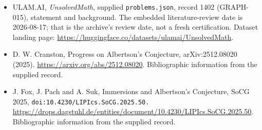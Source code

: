 \documentclass[11pt,a4paper]{article}
\begin{document}
{\small

\begin{itemize}

\item[\hypertarget{source:1402:1}{S1}] ULAM.AI, \emph{UnsolvedMath}, supplied \texttt{problems.json}, record 1402 (GRAPH-015), statement and background. The embedded literature-review date is 2026-08-17; that is the archive’s review date, not a fresh certification. Dataset landing page: \url{https://huggingface.co/datasets/ulamai/UnsolvedMath}.

\item[\hypertarget{source:1402:2}{S2}] D. W. Cranston, Progress on Albertson's Conjecture, arXiv:2512.08020 (2025). \url{https://arxiv.org/abs/2512.08020}. Bibliographic information from the supplied record.

\item[\hypertarget{source:1402:3}{S3}] J. Fox, J. Pach and A. Suk, Immersions and Albertson's Conjecture, SoCG 2025, \nolinkurl{doi:10.4230/LIPIcs.SoCG.2025.50.} \url{https://drops.dagstuhl.de/entities/document/10.4230/LIPIcs.SoCG.2025.50}. Bibliographic information from the supplied record.

\end{itemize}

}

\label{end:1402}
\end{document}
